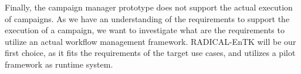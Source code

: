 Finally, the campaign manager prototype does not support the actual execution of
campaigns. As we have an understanding of the requirements to support the
execution of a campaign, we want to investigate what are the requirements to
utilize an actual workflow management framework. RADICAL-EnTK will be our
first choice, as it fits the requirements of the target use cases, and utilizes
a pilot framework as runtime system.
